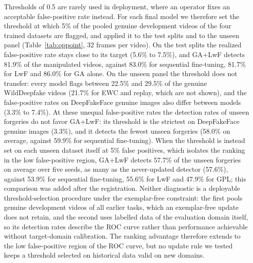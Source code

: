 \documentclass{ieeeaccess}
\begin{document}
Thresholds of 0.5 are rarely used in deployment, where an operator fixes an acceptable false-positive rate instead. For each final model we therefore set the threshold at which 5\% of the pooled genuine development videos of the four trained datasets are flagged, and applied it to the test splits and to the unseen panel (Table~\ref{tab:oppoint}, 32 frames per video). On the test splits the realized false-positive rate stays close to its target (5.6\% to 7.5\%), and GA+LwF detects 81.9\% of the manipulated videos, against 83.0\% for sequential fine-tuning, 81.7\% for LwF and 86.0\% for GA alone. On the unseen panel the threshold does not transfer: every model flags between 22.5\% and 29.5\% of the genuine WildDeepfake videos (21.7\% for EWC and replay, which are not shown), and the false-positive rates on DeepFakeFace genuine images also differ between models (3.3\% to 7.4\%). At these unequal false-positive rates the detection rates of unseen forgeries do not favor GA+LwF: its threshold is the strictest on DeepFakeFace genuine images (3.3\%), and it detects the fewest unseen forgeries (58.0\% on average, against 59.9\% for sequential fine-tuning). When the threshold is instead set on each unseen dataset itself at 5\% false positives, which isolates the ranking in the low false-positive region, GA+LwF detects 57.7\% of the unseen forgeries on average over five seeds, as many as the never-updated detector (57.6\%), against 53.9\% for sequential fine-tuning, 55.6\% for LwF and 47.9\% for GPL; this comparison was added after the registration. Neither diagnostic is a deployable threshold-selection procedure under the exemplar-free constraint: the first pools genuine development videos of all earlier tasks, which an exemplar-free update does not retain, and the second uses labelled data of the evaluation domain itself, so its detection rates describe the ROC curve rather than performance achievable without target-domain calibration. The ranking advantage therefore extends to the low false-positive region of the ROC curve, but no update rule we tested keeps a threshold selected on historical data valid on new domains.
\end{document}

